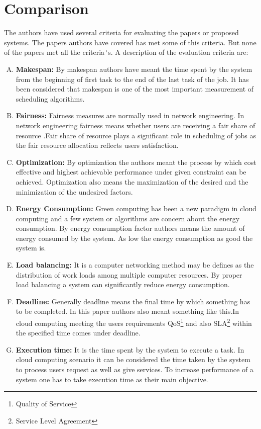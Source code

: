 \documentclass[10pt]{report}
\begin{document}
\chapter{Comparison}
The authors have used several criteria for evaluating the papers or proposed systems. The papers authors have covered has met some of this criteria. But none of the papers met all the criteria\verb|'|s.
A description of the evaluation criteria are:
\\
\begin{enumerate}[A.]

\item \textbf{Makespan:} By makespan authors have  meant the time spent by the system from the beginning of  first task to the end of the last task of the job. It has been considered that makespan is one of the most important measurement of scheduling algorithms.
\item \textbf{Fairness:} Fairness  measures are normally used in network engineering. In network engineering fairness means whether  users are receiving a fair share of resource .Fair share  of resource plays a significant role in scheduling of jobs as the fair resource allocation reflects users satisfaction.
\item \textbf{Optimization:} By optimization the authors meant the process by which  cost effective and highest achievable performance under given constraint can be achieved. Optimization also means the maximization of the desired and the minimization of the undesired factors.
\item \textbf{Energy Consumption:} Green computing has been a new paradigm in cloud computing and a few system or algorithms are concern about the energy consumption. By energy consumption factor authors means the amount of energy consumed by the system. As  low the energy consumption as good the system is.
\item \textbf{Load balancing:} It is a computer networking method may be defines as the distribution of work loads among multiple computer resources. By proper load balancing a system can significantly reduce energy consumption.
\item \textbf{Deadline:} Generally deadline means the final time by which something has to be completed. In this paper authors also meant something like this.In cloud computing meeting the users requirements QoS\footnote{Quality of Service} and also SLA\footnote{Service Level Agreement} within the specified time comes under deadline.
\item \textbf{Execution time:} It is the time spent by the system to execute a task. In cloud computing scenario it can be considered the time taken by the system to process users request as well as give services. To increase performance of a system one has to take  execution time as their main objective.
\end{enumerate}
\end{document}
